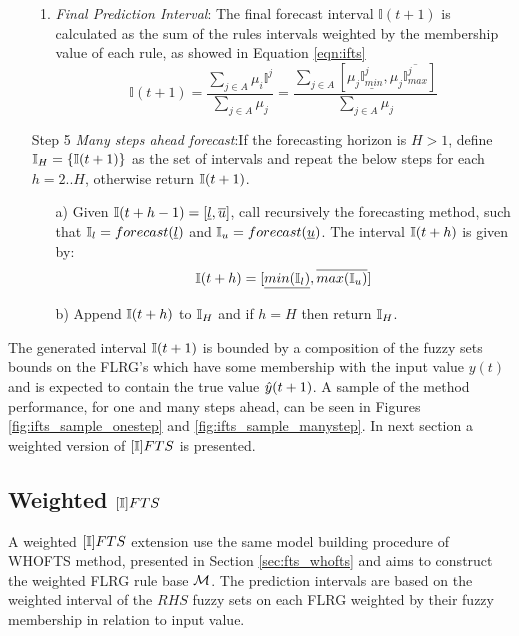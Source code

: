 \begin{enumerate}
\begin{enumerate}
\item \textit{Final Prediction Interval}: The final forecast interval $\mathbb{I}(t+1)$ is calculated as the sum of the rules intervals weighted by the membership value of each rule, as showed in Equation \ref{eqn:ifts}
\begin{equation}
\mathbb{I}(t+1) = \frac{\sum_{j \in A} \mu_i \mathbb{I}^j}{\sum_{j \in A} \mu_j} = \frac{\sum_{j \in A} [\mu_j\underline{\mathbb{I}^j_{min}} , \mu_j\overline{\mathbb{I}^j_{max}}] }{\sum_{j \in A} \mu_j}
\label{eqn:ifts}
\end{equation}
\end{enumerate}
\item[Step 5] \textit{Many steps ahead forecast}:If the forecasting horizon is $H > 1$, define $\mathbb{I}_H = \{\mathbb{I}(t+1)\}$ as the set of intervals and repeat the below steps for each $h=2..H$, otherwise return  $\mathbb{I}(t+1)$.
\begin{enumerate}
    \item[a)]  Given $\mathbb{I}(t+h-1)= [\underline{l},\overline{u}]$, call recursively the forecasting method, such that $\mathbb{I}_l = forecast(\underline{l})$ and $\mathbb{I}_u = forecast(\underline{u})$. The interval $\mathbb{I}(t+h)$ is given by:
    \begin{equation}
        \mathbb{I}(t+h)= [\underline{min(\mathbb{I}_l)},\overline{max(\mathbb{I}_u)}]
    \end{equation}
    \item[b)] Append $\mathbb{I}(t+h)$ to $\mathbb{I}_H$ and if $h = H$ then return $\mathbb{I}_H$.
\end{enumerate}
\end{enumerate}

The generated interval $\mathbb{I}(t+1)$ is bounded by a composition of the fuzzy sets bounds on the FLRG's which have some membership with the input value $y(t)$ and is expected to contain the true value $\hat{y}(t+1)$. A sample of the method performance, for one and many steps ahead, can be seen in Figures \ref{fig:ifts_sample_onestep} and \ref{fig:ifts_sample_manystep}. In next section a weighted version of $[\mathbb{I}]FTS$ is presented. 

%
\subsection{Weighted $[\mathbb{I}]FTS$}
\label{sec:wifts}

A weighted $[\mathbb{I}]FTS$ extension use the same model building procedure  of WHOFTS method, presented in Section \ref{sec:fts_whofts} and aims to construct the weighted FLRG rule base $\mathcal{M}$. The prediction intervals are based on the weighted interval of the $RHS$ fuzzy sets on each FLRG weighted by their fuzzy membership in relation to input value.

